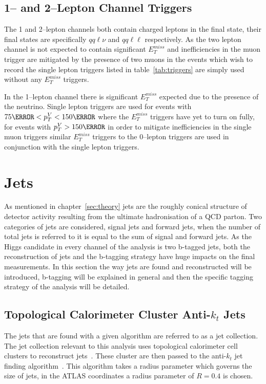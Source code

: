 \subsection{1-- and 2--Lepton Channel Triggers}
The 1 and 2--lepton channels both contain charged leptons in the final state,
their final states are specifically $qq\ell\nu$ and $qq\ell\ell$ respectively.
As the two lepton channel is not expected to contain significant $E_T^{miss}$
and inefficiencies in the muon trigger are mitigated by the presence of two
muons in the events which wish to record the single lepton triggers listed in
table~\ref{tab:triggers} are simply used without any $E_T^{miss}$ triggers.

In the 1--lepton channel there is significant $E_T^{miss}$ expected due to the
presence of the neutrino. Single lepton triggers are used for events with $75
\GeV < p_T^{V} < 150 \GeV$ where the $E_T^{miss}$ triggers have yet to turn on
fully, for events with $p_T^{V} > 150 \GeV$ in order to mitigate inefficiencies
in the single muon triggers similar $E_T^{miss}$ triggers to the 0--lepton
triggers are used in conjunction with the single lepton triggers.


\section{Jets}
\label{sec:jets}

As mentioned in chapter~\ref{sec:theory} jets are the roughly conical structure
of detector activity resulting from the ultimate hadronisation of a QCD parton.
Two categories of jets are considered, signal jets and forward jets, when the
number of total jets is referred to it is equal to the sum of signal and forward
jets. As the Higgs candidate in every channel of the analysis is two b-tagged
jets, both the reconstruction of jets and the b-tagging strategy have huge
impacts on the final measurements. In this section the way jets are found and
reconstructed will be introduced, b-tagging will be explained in general and
then the specific tagging strategy of the analysis will be detailed.

\subsection{Topological Calorimeter Cluster Anti-$k_t$ Jets}
The jets that are found with a given algorithm are referred to as a jet
collection. The jet collection relevant to this analysis uses topological
calorimeter cell clusters to reconstruct jets~\cite{emtopo}. These cluster are
then passed to the anti-$k_t$ jet finding algorithm~\cite{anti-kt}. This
algorithm takes a radius parameter which governs the size of jets, in the ATLAS
coordinates a radius parameter of $R=0.4$ is chosen.


